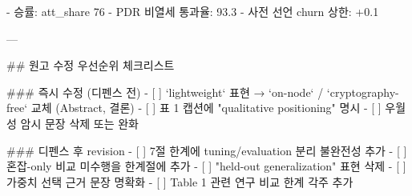 - 승률: att_share 76%
- PDR 비열세 통과율: 93.3%
- 사전 선언 churn 상한: +0.1

---

## 원고 수정 우선순위 체크리스트

### 즉시 수정 (디펜스 전)
- [ ] `lightweight` 표현 → `on-node` / `cryptography-free` 교체 (Abstract, 결론)
- [ ] 표 1 캡션에 "qualitative positioning" 명시
- [ ] 우월성 암시 문장 삭제 또는 완화

### 디펜스 후 revision
- [ ] 7절 한계에 tuning/evaluation 분리 불완전성 추가
- [ ] 혼잡-only 비교 미수행을 한계절에 추가
- [ ] "held-out generalization" 표현 삭제
- [ ] 가중치 선택 근거 문장 명확화
- [ ] Table 1 관련 연구 비교 한계 각주 추가